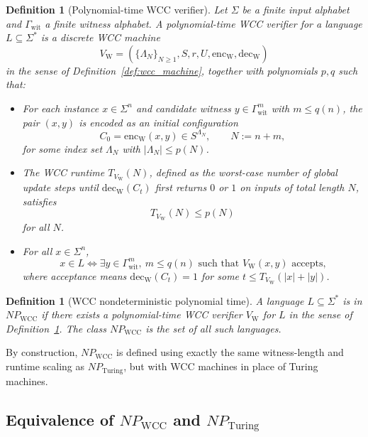 \documentclass[12pt]{article}
\newtheorem{definition}[theorem]{Definition}
\begin{document}
\begin{definition}[Polynomial-time WCC verifier]
\label{def:wcc_verifier}
Let $\Sigma$ be a finite input alphabet and $\Gamma_{\mathrm{wit}}$ a finite
witness alphabet. A \emph{polynomial-time WCC verifier} for a language
$L \subseteq \Sigma^*$ is a discrete WCC machine
\[
V_{\mathrm{W}} = (\{\Lambda_N\}_{N\ge 1}, S, r, U, \mathrm{enc}_{\mathrm{W}},
\mathrm{dec}_{\mathrm{W}})
\]
in the sense of Definition~\ref{def:wcc_machine}, together with polynomials
$p,q$ such that:
\begin{itemize}
  \item For each instance $x \in \Sigma^n$ and candidate witness
    $y \in \Gamma_{\mathrm{wit}}^{m}$ with $m \le q(n)$, the pair $(x,y)$ is
    encoded as an initial configuration
    \[
    C_0 = \mathrm{enc}_{\mathrm{W}}(x,y) \in S^{\Lambda_N},
    \qquad N := n + m,
    \]
    for some index set $\Lambda_N$ with $|\Lambda_N| \le p(N)$.
  \item The WCC runtime $T_{V_{\mathrm{W}}}(N)$, defined as the worst-case
    number of global update steps until $\mathrm{dec}_{\mathrm{W}}(C_t)$
    first returns $0$ or $1$ on inputs of total length $N$, satisfies
    \[
    T_{V_{\mathrm{W}}}(N) \le p(N)
    \]
    for all $N$.
  \item For all $x \in \Sigma^n$,
    \[
    x \in L
    \iff
    \exists y \in \Gamma_{\mathrm{wit}}^{m},\ m \le q(n) \text{ such that }
    V_{\mathrm{W}}(x,y) \text{ accepts,}
    \]
    where acceptance means $\mathrm{dec}_{\mathrm{W}}(C_t) = 1$ for some
    $t \le T_{V_{\mathrm{W}}}(|x|+|y|)$.
\end{itemize}
\end{definition}

\begin{definition}[WCC nondeterministic polynomial time]
\label{def:npwcc}
A language $L \subseteq \Sigma^*$ is in $NP_{\mathrm{WCC}}$ if there exists a
polynomial-time WCC verifier $V_{\mathrm{W}}$ for $L$ in the sense of
Definition~\ref{def:wcc_verifier}. The class $NP_{\mathrm{WCC}}$ is the set of
all such languages.
\end{definition}

By construction, $NP_{\mathrm{WCC}}$ is defined using exactly the same
witness-length and runtime scaling as $NP_{\mathrm{Turing}}$, but with WCC
machines in place of Turing machines.

\subsection{Equivalence of $NP_{\mathrm{WCC}}$ and $NP_{\mathrm{Turing}}$}
\end{document}

